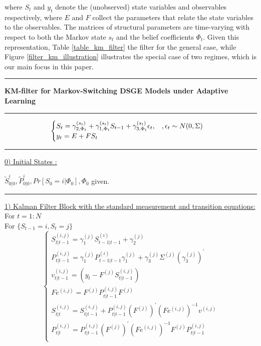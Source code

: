 \documentclass[12pt,reqno]{article}
\numberwithin{equation}{section}
\begin{document}
where $S_t$ and $y_t$ denote the (unobserved) state variables and observables respectively, where $E$ and $F$ collect the parameters that relate the state variables to the observables. The matrices of structural parameters are time-varying with respect to both the Markov state $s_t$ and the belief coefficients $\Phi_t$. Given this representation, Table \ref{table_km_filter} the filter for the general case, while Figure \ref{filter_km_illustration} illustrates the special case of two regimes, which is our main focus in this paper. \\


\begin{table}[H]
\label{table_km_filter}
\noindent\rule{\textwidth}{1pt}
\textbf{KM-filter for Markov-Switching DSGE Models under Adaptive Learning}\\
\noindent\rule{\textwidth}{1pt}
$$
\begin{cases}
S_t = \gamma_{2,\Phi_t}^{(s_t)} + \gamma_{1,\Phi_t}^{(s_t)} S_{t-1} + \gamma_{3,\Phi_t}^{(s_t)} \epsilon_t, \hspace{3 mm}, \epsilon_t \sim N(0, \Sigma) \\
y_t = E+ F S_t \\
\end{cases}
$$

\noindent\rule{\textwidth}{1pt}

\underline{0) Initial  States :}

$ \tilde{S}_{0|0}^{i}, \tilde{P}_{0|0}^{i}, Pr[ S_0=i | \Phi_0] , \Phi_0$  given.\\
\noindent\rule{\textwidth}{1pt}

\noindent
\underline{1) Kalman Filter Block with the standard measurement and transition equations:} \\
For $t=1:N$\\
    For $\{S_{t-1}=i, S_t=j\} $
\noindent
$$
\begin{cases}
S_{t|t-1}^{(i,j)}=\gamma_1^{(j)} S_{t-1|t-1}^{(i)} + \gamma_2^{(j)} \\
P_{t|t-1}^{(i,j)}=\gamma_1^{(j)} P_{t-1|t-1}^{(i)} \gamma_1^{(j)} + \gamma_3^{(j)} \Sigma^{(j)} (\gamma_3^{(j)})^{\prime} \\
v^{(i,j)}_{t|t-1} = (y_t - F^{(j)} S_{t|t-1}^{(i,j)})\\
Fe^{(i,j)}=F^{(j)} P_{t|t-1}^{(i,j)}F^{(j)} \\
S_{t|t}^{(i,j)}= S_{t|t-1}^{(i,j)} + P_{t|t-1}^{(i,j)} (F^{(j)})^{\prime} {(Fe^{(i,j)})}^{-1} v^{(i,j)} \\
P_{t|t}^{(i,j)} = P_{t|t-1}^{(i,j)} (F^{(j)})^{\prime} (Fe^{(i,j)})^{-1} F^{(j)} P_{t|t-1}^{(i,j)} \\
\end{cases}
$$


\end{table}
\end{document}
